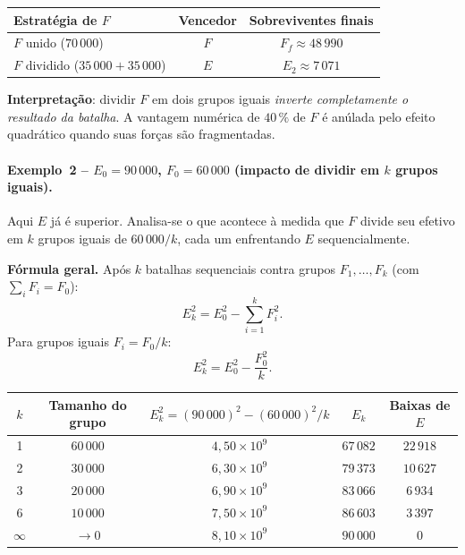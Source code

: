 \documentclass[12pt,a4paper]{article}
\theoremstyle{definition}
\begin{document}
\begin{center}
\begin{tabular}{lcc}
\toprule
Estrat\'egia de $F$ & Vencedor & Sobreviventes finais \\
\midrule
$F$ unido ($70\,000$)              & $F$ & $F_f \approx 48\,990$ \\
$F$ dividido ($35\,000 + 35\,000$) & $E$ & $E_2 \approx 7\,071$ \\
\bottomrule
\end{tabular}
\end{center}

\textbf{Interpreta\c{c}\~ao}: dividir $F$ em dois grupos iguais
\emph{inverte completamente o resultado da batalha}.
A vantagem num\'erica de $40\,\%$ de $F$ \'e an\'ulada pelo efeito quadr\'atico
quando suas for\c{c}as s\~ao fragmentadas.

\paragraph{Exemplo~2 -- $E_0 = 90\,000$,\; $F_0 = 60\,000$
  (impacto de dividir em $k$ grupos iguais).}

Aqui $E$ j\'a \'e superior.
Analisa-se o que acontece \`a medida que $F$ divide seu efetivo em
$k$ grupos iguais de $60\,000/k$, cada um enfrentando $E$ sequencialmente.

\noindent\textbf{F\'ormula geral.}
Ap\'os $k$ batalhas sequenciais contra grupos $F_1, \ldots, F_k$
(com $\textstyle\sum_i F_i = F_0$):
\begin{equation}
  E_k^2 = E_0^2 - \sum_{i=1}^{k} F_i^2.
  \label{eq:geral_k}
\end{equation}
Para grupos iguais $F_i = F_0/k$:
\begin{equation}
  E_k^2 = E_0^2 - \frac{F_0^2}{k}.
\end{equation}

\begin{center}
\begin{tabular}{ccccc}
\toprule
$k$ & Tamanho do grupo & $E_k^2 = (90\,000)^2 - (60\,000)^2/k$
    & $E_k$ & Baixas de $E$ \\
\midrule
1        & $60\,000$ & $4{,}50\times10^{9}$ & $67\,082$ & $22\,918$ \\
2        & $30\,000$ & $6{,}30\times10^{9}$ & $79\,373$ & $10\,627$ \\
3        & $20\,000$ & $6{,}90\times10^{9}$ & $83\,066$ & $6\,934$  \\
6        & $10\,000$ & $7{,}50\times10^{9}$ & $86\,603$ & $3\,397$  \\
$\infty$ & $\to 0$   & $8{,}10\times10^{9}$ & $90\,000$ & $0$       \\
\bottomrule
\end{tabular}
\end{center}
\end{document}
